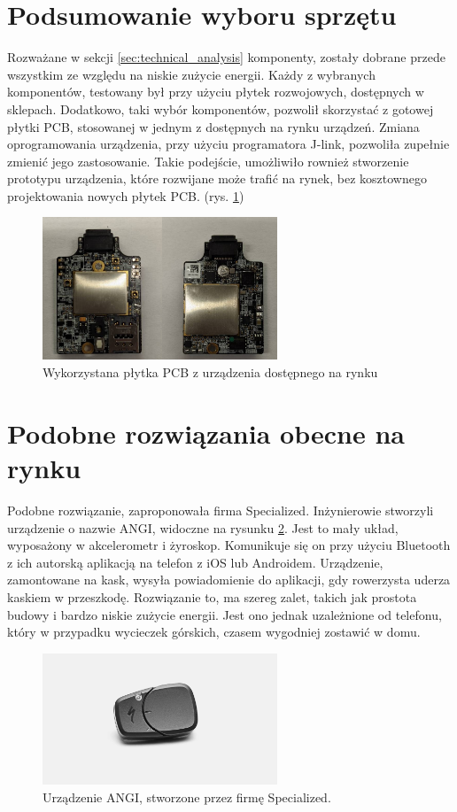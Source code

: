 \section{Podsumowanie wyboru sprzętu}
Rozważane w sekcji \ref{sec:technical_analysis} komponenty, zostały dobrane przede wszystkim ze względu na niskie zużycie energii. Każdy z wybranych komponentów, testowany był przy użyciu płytek rozwojowych, dostępnych w sklepach. Dodatkowo, taki wybór komponentów, pozwolił skorzystać z gotowej płytki PCB, stosowanej w jednym z dostępnych na rynku urządzeń. Zmiana oprogramowania urządzenia, przy użyciu programatora J-link, pozwoliła zupełnie zmienić jego zastosowanie. Takie podejście, umożliwiło rownież stworzenie prototypu urządzenia, które rozwijane może trafić na rynek, bez kosztownego projektowania nowych płytek PCB. (rys. \ref{img:pcb})

\begin{figure}[t]
    \centering
    \includegraphics[width=7cm]{Graphics/PCB.png}
    \caption{Wykorzystana płytka PCB z urządzenia dostępnego na rynku}
    \label{img:pcb}
\end{figure}
\section{Podobne rozwiązania obecne na rynku}
Podobne rozwiązanie, zaproponowała firma Specialized. Inżynierowie stworzyli urządzenie o nazwie ANGI, widoczne na rysunku \ref{img:angi_img}. Jest to mały układ, wyposażony w akcelerometr i żyroskop. Komunikuje się on przy użyciu Bluetooth z ich autorską aplikacją na telefon z iOS lub Androidem. Urządzenie, zamontowane na kask, wysyła powiadomienie do aplikacji, gdy rowerzysta uderza kaskiem w przeszkodę. Rozwiązanie to, ma szereg zalet, takich jak prostota budowy i bardzo niskie zużycie energii. Jest ono jednak uzależnione od telefonu, który w przypadku wycieczek górskich, czasem wygodniej zostawić w domu.
\begin{figure}[h]
\includegraphics[width=7cm]{Graphics/angi.png}
\centering
\caption{Urządzenie ANGI, stworzone przez firmę Specialized.\cite{ANGI}}
\centering
\label{img:angi_img}
\end{figure}















